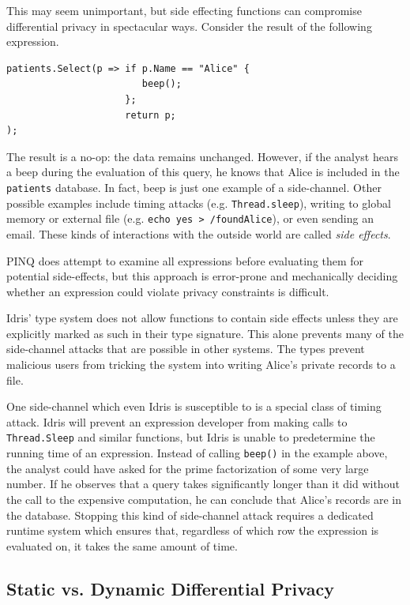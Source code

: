 \documentclass[12pt]{report}
\begin{document}
This may seem unimportant, but side effecting functions can compromise differential privacy in spectacular ways.
Consider the result of the following expression.

\begin{lstlisting}[float,caption={Example side-channel attack}]
patients.Select(p => if p.Name == "Alice" {
                        beep();
                     };
                     return p;
);
\end{lstlisting}

The result is a no-op: the data remains unchanged.
However, if the analyst hears a beep during the evaluation of this query, he knows that Alice is included in the \texttt{patients} database.
In fact, beep is just one example of a side-channel.
Other possible examples include timing attacks (e.g. \texttt{Thread.sleep}), writing to global memory or external file (e.g. \texttt{echo yes > /foundAlice}), or even sending an email.
These kinds of interactions with the outside world are called \textit{side effects}.

PINQ does attempt to examine all expressions before evaluating them for potential side-effects, but this approach is error-prone and mechanically deciding whether an expression could violate privacy constraints is difficult.

Idris' type system does not allow functions to contain side effects unless they are explicitly marked as such in their type signature.
This alone prevents many of the side-channel attacks that are possible in other systems.
The types prevent malicious users from tricking the system into writing Alice's private records to a file.

One side-channel which even Idris is susceptible to is a special class of timing attack.
Idris will prevent an expression developer from making calls to \texttt{Thread.Sleep} and similar functions, but Idris is unable to predetermine the running time of an expression.
Instead of calling \texttt{beep()} in the example above, the analyst could have asked for the prime factorization of some very large number.
If he observes that a query takes significantly longer than it did without the call to the expensive computation, he can conclude that Alice's records are in the database.
Stopping this kind of side-channel attack requires a dedicated runtime system which ensures that, regardless of which row the expression is evaluated on, it takes the same amount of time\cite{conf/uss/HaeberlenPN11}.

\subsection{Static vs. Dynamic Differential Privacy}
\end{document}
